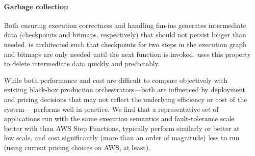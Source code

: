 \paragraph{Garbage collection} Both ensuring execution correctness and handling
fan-ins generates intermediate data (checkpoints and bitmaps, respectively) that
should not persist longer than needed. \name{} is architected such that
checkpoints for two steps in the execution graph and bitmaps are only needed
until the next function is invoked. \name{} uses this property to delete
intermediate data quickly and predictably.

While both performance and cost are difficult to compare objectively with
existing black-box production orchestrators---both are influenced by deployment
and pricing decisions that may not reflect the underlying efficiency or cost of
the system---\name{} performs well in practice. We find that a representative
set of applications run with the same execution semantics and fault-tolerance
scale better with \name{} than AWS Step Functions, typically perform similarly
or better at low scale, and cost significantly (more than an order of magnitude)
less to run (using current pricing choices on AWS, at least).





